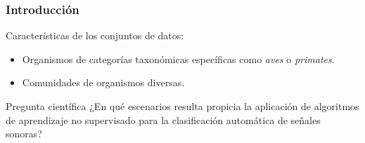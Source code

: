 \begin{frame}
    \frametitle{Introducción}

    Características de los conjuntos de datos:
    \begin{itemize}
        \item Organismos de categorías taxonómicas específicas como \textit{aves} o \textit{primates}.
        \item Comunidades de organismos diversas.
    \end{itemize}

    \begin{block}{Pregunta científica}
        ¿En qué escenarios resulta propicia la aplicación de algoritmos de aprendizaje no supervisado para la clasificación automática de señales sonoras?
    \end{block}
\end{frame}